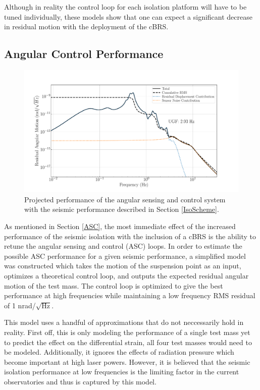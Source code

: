 \documentclass [12pt, proquest]{uwthesis}[2019]
\begin{document}
Although in reality the control loop for each isolation platform will have to be tuned individually, these models show that one can expect a significant decrease in residual motion with the deployment of the cBRS.

\subsection{Angular Control Performance}

\begin{figure}[!h]
\begin{center}
\includegraphics[width=\textwidth]{cBRS_ASC_With.pdf}
\caption[Projected performance of the angular sensing and control system]{Projected performance of the angular sensing and control system with the seismic performance described in Section \ref{IsoScheme}.}
\label{ascWith}
\end{center}
\end{figure}

As mentioned in Section \ref{ASC}, the most immediate effect of the increased performance of the seismic isolation with the inclusion of a cBRS is the ability to retune the angular sensing and control (ASC) loops. In order to estimate the possible ASC performance for a given seismic performance, a simplified model was constructed which takes the motion of the suspension point as an input, optimizes a theoretical control loop, and outputs the expected residual angular motion of the test mass. The control loop is optimized to give the best performance at high frequencies while maintaining a low frequency RMS residual of 1 nrad/$\sqrt{\text{Hz}}$.

This model uses a handful of approximations that do not neccessarily hold in reality. First off, this is only modeling the performance of a single test mass yet to predict the effect on the differential strain, all four test masses would need to be modeled. Additionally, it ignores the effects of radiation pressure which become important at high laser powers. \cite{ASC} However, it is believed that the seismic isolation performance at low frequencies is the limiting factor in the current observatories and thus is captured by this model. 
\end{document}
